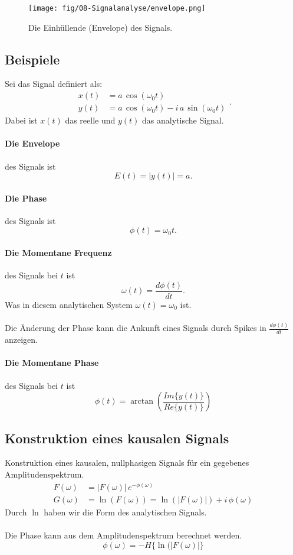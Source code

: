 \begin{figure}[h!]
\centering
\texttt{[image: fig/08-Signalanalyse/envelope.png]}
\caption{Die Einhüllende (Envelope) des Signals.}
\end{figure}

\subsection{Beispiele}
Sei das Signal definiert als:
\[
\begin{split}
x(t) & = a\, \cos (\omega_0 t)\\
y(t) & = a\, \cos(\omega_0 t) - i\, a\, \sin (\omega_0 t)
\end{split}.
\]
Dabei ist $x(t)$ das reelle und $y(t)$ das analytische Signal.

\paragraph{Die Envelope} des Signals ist
\[
E(t) = |y(t)| = a.
\]

\paragraph{Die Phase} des Signals ist
\[
\phi(t) = \omega_0 t.
\]

\paragraph{Die Momentane Frequenz} des Signals bei $t$ ist
\[
\omega(t) = \frac{d \phi(t)}{d t}.
\]
Was in diesem analytischen System $\omega(t) = \omega_0$ ist.\\\\
Die Änderung der Phase kann die Ankunft eines Signals durch Spikes in $\frac{d \phi(t)}{d t}$ anzeigen.

\paragraph{Die Momentane Phase} des Signals bei $t$ ist
\[
\phi(t) = \arctan\left( \frac{Im\{y(t)\}}{Re\{y(t)\}} \right)
\]
\subsection{Konstruktion eines kausalen Signals}
Konstruktion eines kausalen, nullphasigen Signals für ein gegebenes Amplitudenspektrum.
\[
\begin{split}
F(\omega) & = |F(\omega)|\, e^{-\phi(\omega)}\\
G(\omega) & = \ln(F(\omega)) = \ln(|F(\omega)|) + i\,\phi(\omega)
\end{split}
\]
Durch $\ln$ haben wir die Form des analytischen Signals.\\\\
Die Phase kann aus dem Amplitudenspektrum berechnet werden.
\[
\phi(\omega) = -H\{\ln(|F(\omega)|\}
\]

